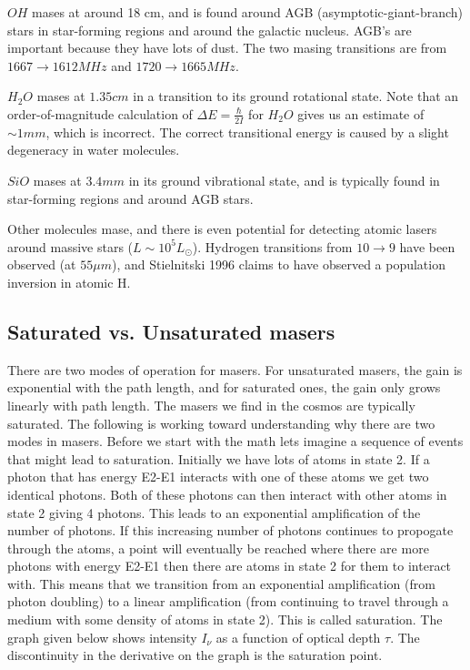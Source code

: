 \documentclass{article}
\begin{document}
$OH$ mases at around 18 cm, and is found around AGB (asymptotic-giant-branch)
stars in star-forming regions and around the galactic nucleus.  AGB's are
important because they have lots of dust.  The two masing transitions are
from $1667\to1612MHz$ and $1720\to1665MHz$.\par
$H_2O$ mases at $1.35 cm$ in a transition to its ground rotational state.  Note
that an order-of-magnitude calculation of $\Delta E=\frac{\hbar}{ 2I}$ for $H_2O$
gives us an estimate of $\sim 1 mm$, which is incorrect.  The correct 
transitional energy is caused by a slight degeneracy in water molecules.\par
$SiO$ mases at $3.4 mm$ in its ground vibrational state, and is typically
found in star-forming regions and around AGB stars.\par
Other molecules mase, and there is even potential for detecting atomic lasers 
around massive stars ($L\sim10^5 L_\odot$).  Hydrogen transitions from $10\to9$
have been observed (at $55\mu m$), and Stielnitski 1996 claims to have observed
a population inversion in atomic H.

\subsection{ Saturated vs. Unsaturated masers }

There are two modes of operation for masers.  For unsaturated masers, the gain
is exponential with the path length, and for saturated ones, the gain only
grows linearly with path length.  The masers we find in the cosmos are typically
saturated.  The following is working toward understanding why there are two
modes in masers. Before we start with the math lets imagine a sequence of events that
might lead to saturation. Initially we have lots of atoms in state 2. If a photon that has
energy E2-E1 interacts with one of these atoms we get two identical photons. Both of these photons
can then interact with other atoms in state 2 giving 4 photons. This leads to an exponential amplification
of the number of photons. If this increasing number of photons continues to propogate through the atoms, a point will eventually be reached where 
there are more photons with energy E2-E1 then there are atoms in state 2 for them to interact with. This means that we transition from an exponential amplification
(from photon doubling) to a linear amplification (from continuing to travel through a medium with some density of atoms in state 2). This is called saturation.
The graph given below shows intensity $I_\nu$ as a function of optical depth $\tau$. The discontinuity in the derivative on the graph is the saturation point.
\end{document}
